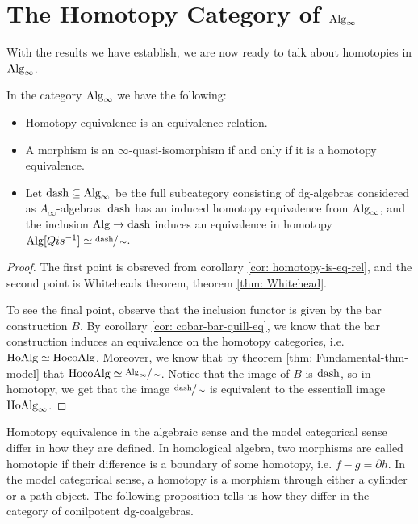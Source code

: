 \documentclass[../thesis.tex]{subfiles}
\begin{document}
    \section{The Homotopy Category of $\tt{Alg}_\infty$}

    With the results we have establish, we are now ready to talk about homotopies in $\tt{Alg}_\infty$.

    \begin{thm}\label{thm: model-Alg-inf}
        In the category $\tt{Alg}_\infty$ we have the following:
        \begin{itemize}
            \item Homotopy equivalence is an equivalence relation.
            \item A morphism is an $\infty$-quasi-isomorphism if and only if it is a homotopy equivalence.
            \item Let $\tt{dash} \subseteq \tt{Alg}_\infty$ be the full subcategory consisting of dg-algebras considered as $A_\infty$-algebras. $\tt{dash}$ has an induced homotopy equivalence from $\tt{Alg}_\infty$, and the inclusion $\tt{Alg} \rightarrow \tt{dash}$ induces an equivalence in homotopy $\tt{Alg}[Qis^{-1}] \simeq \sfrac{\tt{dash}}{\sim}$.
        \end{itemize}
    \end{thm}

    \begin{proof}
        The first point is obsreved from corollary \ref{cor: homotopy-is-eq-rel}, and the second point is Whiteheads theorem, theorem \ref{thm: Whitehead}.

        To see the final point, observe that the inclusion functor is given by the bar construction $B$. By corollary \ref{cor: cobar-bar-quill-eq}, we know that the bar construction induces an equivalence on the homotopy categories, i.e. $\tt{Ho}\tt{Alg} \simeq \tt{Ho}\tt{coAlg}$. Moreover, we know that by theorem \ref{thm: Fundamental-thm-model} that $\tt{Ho}\tt{coAlg} \simeq \sfrac{\tt{Alg}_\infty}{\sim}$. Notice that the image of $B$ is $\tt{dash}$, so in homotopy, we get that the image $\sfrac{\tt{dash}}{\sim}$ is equivalent to the essentiall image $\tt{Ho}\tt{Alg}_\infty$.
    \end{proof}

    Homotopy equivalence in the algebraic sense and the model categorical sense differ in how they are defined. In homological algebra, two morphisms are called homotopic if their difference is a boundary of some homotopy, i.e. $f-g = \partial h$. In the model categorical sense, a homotopy is a morphism through either a cylinder or a path object. The following proposition tells us how they differ in the category of conilpotent dg-coalgebras.
\end{document}
